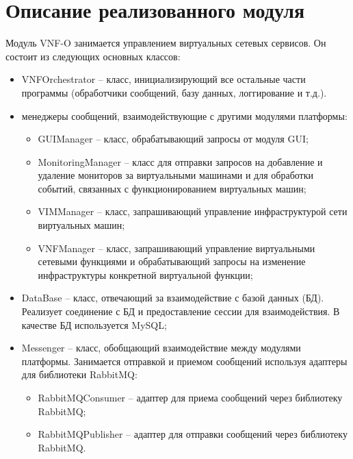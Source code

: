 \documentclass[oneside,final,14pt,a4paper]{extreport}
\begin{document}
\section{Описание реализованного модуля}
\label{sec:developed_module}
Модуль VNF-O занимается управлением виртуальных сетевых сервисов. Он состоит из следующих основных классов:
\begin{itemize}
	\item VNFOrchestrator -- класс, инициализирующий все остальные части программы (обработчики сообщений, базу данных, логгирование и т.д.).
	\item менеджеры сообщений, взаимодействующие с другими модулями платформы:
	\begin{itemize}
		\item GUIManager -- класс, обрабатывающий запросы от модуля GUI;
		\item MonitoringManager -- класс для отправки запросов на добавление и удаление мониторов за виртуальными машинами и для обработки событий, связанных с функционированием виртуальных машин;
		\item VIMManager -- класс, запрашивающий управление инфраструктурой сети виртуальных машин;
		\item VNFManager -- класс, запрашивающий управление виртуальными сетевыми функциями и обрабатывающий запросы на изменение инфраструктуры конкретной виртуальной функции;
	\end{itemize}
	\item DataBase -- класс, отвечающий за взаимодействие с базой данных (БД). Реализует соединение с БД и предоставление сессии для взаимодействия. В качестве БД используется MySQL;
	\item Messenger -- класс, обобщающий взаимодействие между модулями платформы. Занимается отправкой и приемом сообщений используя адаптеры для библиотеки RabbitMQ:
	\begin{itemize}
		\item RabbitMQConsumer -- адаптер для приема сообщений через библиотеку RabbitMQ;
		\item RabbitMQPublisher -- адаптер для отправки сообщений через библиотеку RabbitMQ.
	\end{itemize}
\end{itemize}
\end{document}
